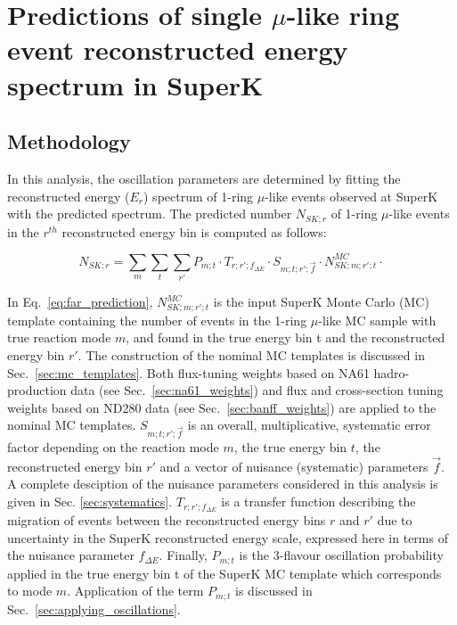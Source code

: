 
\section {Predictions of single $\mu$-like ring event reconstructed energy spectrum in SuperK}
\label{sec:spectrum_prediction}

\subsection {Methodology}

In this analysis, 
the oscillation parameters are determined 
by fitting the reconstructed energy ($E_{r}$) spectrum
of 1-ring $\mu$-like events observed at SuperK with the predicted spectrum.
The predicted number $N_{SK;r}$ 
of 1-ring $\mu$-like events in the $r^{th}$ reconstructed energy bin
is computed as follows:

\begin{equation}
\displaystyle
  N_{SK;r} = 
    \sum_{m} \sum_{t} \sum_{r\prime}
        P_{m;t} \cdot
        T_{r;r\prime;f_{{\Delta}E}} \cdot
        S_{m;t;r\prime;\vec{f}} \cdot
        N_{SK;m;r\prime;t}^{MC} \cdot
\label{eq:far_prediction}
\end{equation}

In Eq.\ \ref{eq:far_prediction}, $N_{SK;m;r\prime;t}^{MC}$ is the input SuperK Monte Carlo (MC) template 
containing the number of events in the 1-ring $\mu$-like MC sample with true reaction mode $m$, 
and found in the true energy bin t and the reconstructed energy bin $r\prime$.
The construction of the nominal MC templates is discussed in Sec.\ \ref{sec:mc_templates}.
Both flux-tuning weights based on NA61 hadro-production data (see Sec.\ \ref{sec:na61_weights})
and flux and cross-section tuning weights based on ND280 data (see Sec.\ \ref{sec:banff_weights})
are applied to the nominal MC templates.
$S_{m;t;r\prime;\vec{f}}$ is an overall, multiplicative, systematic error factor 
depending on the reaction mode $m$, the true energy bin $t$, the reconstructed energy bin $r\prime$ 
and a vector of nuisance (systematic) parameters $\vec{f}$. 
A complete desciption of the nuisance parameters considered in this analysis is given in Sec. \ref{sec:systematics}.
$T_{r;r\prime;f_{{\Delta}E}}$ is a transfer function describing the migration of events
between the reconstructed energy bins $r$ and $r\prime$ due to uncertainty in the SuperK reconstructed energy
scale, expressed here in terms of the nuisance parameter $f_{{\Delta}E}$.
Finally, $P_{m;t}$ is the 3-flavour oscillation probability applied in the true energy
bin t of the SuperK MC template which corresponds to mode $m$.
Application of the term $P_{m;t}$ is discussed in Sec.\ \ref{sec:applying_oscillations}.

